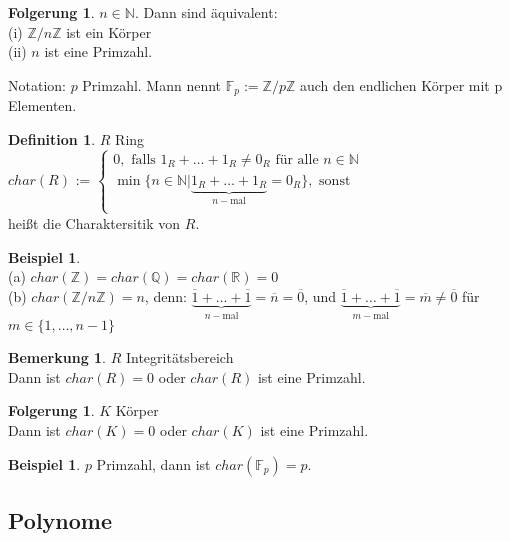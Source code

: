 \documentclass[10pt,a4paper,numbers=endperiod]{scrartcl}
\theoremstyle{definition}
\newtheorem{defi}[satz]{Definition}
\newtheorem{bem}[satz]{Bemerkung}
\newtheorem{bsp}[satz]{Beispiel}
\newtheorem{folg}[satz]{Folgerung}
\begin{document}
\begin{folg}
	$n \in \mathbb{N}$. Dann sind äquivalent:\\
	(i) $\mathbb{Z}/n\mathbb{Z}$ ist ein Körper\\
	(ii) $n$ ist eine Primzahl.
\end{folg}

Notation: $p$ Primzahl. Mann nennt $\mathbb{F}_p := \mathbb{Z}/p\mathbb{Z}$ auch den endlichen Körper mit p Elementen.

\begin{defi}
	$R$ Ring\\
	$char(R)$ := $\begin{cases} 0, \text{ falls } 1_R+ \dots +1_R \neq 0_R \text{ für alle } n \in \mathbb{N}\\
	\min \{n \in \mathbb{N}|\underbrace{1_R+ \dots +1_R}_{n-\text{mal}}=0_R\}, \text{    sonst}\\
	\end{cases}$\\
	heißt die Charaktersitik von $R$.
\end{defi}

\begin{bsp}
	$ $ \\
	(a) $char(\mathbb{Z}) = char(\mathbb{Q}) = char(\mathbb{R}) = 0$\\
	(b) $char(\mathbb{Z}/n\mathbb{Z}) = n$, denn: $\underbrace{\overline{1}+ \dots +\overline{1}}_{n-\text{mal}} = \overline{n} = \overline{0}$, und $\underbrace{\overline{1}+ \dots +\overline{1}}_{m-\text{mal}} = \overline{m} \neq \overline{0}$ für $m \in \{1, \dots, n-1\}$
\end{bsp}

\begin{bem}
	$R$ Integritätsbereich\\
	Dann ist $char(R) = 0$ oder $char(R)$ ist eine Primzahl.
\end{bem}

\begin{folg}
	$K$ Körper\\
	Dann ist $char(K) = 0$ oder $char(K)$ ist eine Primzahl.
\end{folg}

\begin{bsp}
	$p$ Primzahl, dann ist $char(\mathbb{F}_p) = p$. 
\end{bsp}

\subsection{Polynome}
\end{document}
